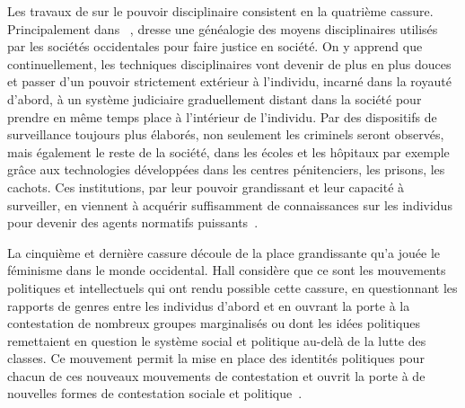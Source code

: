 Les travaux de \citeauthor{Foucault2004a} sur le pouvoir disciplinaire consistent en la quatrième cassure. 
Principalement dans ~\citeyearpar{Foucault2004a}, \citeauthor{Foucault2004a} dresse une généalogie des moyens disciplinaires utilisés par les sociétés occidentales pour faire justice en société. 
On y apprend que continuellement, les techniques disciplinaires vont devenir de plus en plus douces et passer d'un pouvoir strictement extérieur à l'individu, incarné dans la royauté d'abord, à un système judiciaire graduellement distant dans la société pour prendre en même temps place à l'intérieur de l'individu. 
Par des dispositifs de surveillance toujours plus élaborés, non seulement les criminels seront observés, mais également le reste de la société, dans les écoles et les hôpitaux par exemple grâce aux technologies développées dans les centres pénitenciers, les prisons, les cachots. 
Ces institutions, par leur pouvoir grandissant et leur capacité à surveiller, en viennent à acquérir suffisamment de connaissances sur les individus pour devenir des agents normatifs puissants~\citep[608--609]{Hall1996a}.

La cinquième et dernière cassure découle de la place grandissante qu'a jouée le féminisme dans le monde occidental. 
Hall considère que ce sont les mouvements politiques et intellectuels qui ont rendu possible cette cassure, en questionnant les rapports de genres entre les individus d'abord et en ouvrant la porte à la contestation de nombreux groupes marginalisés ou dont les idées politiques remettaient en question le système social et politique au-delà de la lutte des classes. 
Ce mouvement permit la mise en place des identités politiques pour chacun de ces nouveaux mouvements de contestation et ouvrit la porte à de nouvelles formes de contestation sociale et politique~\citeyearpar[610]{Hall1996a}.


